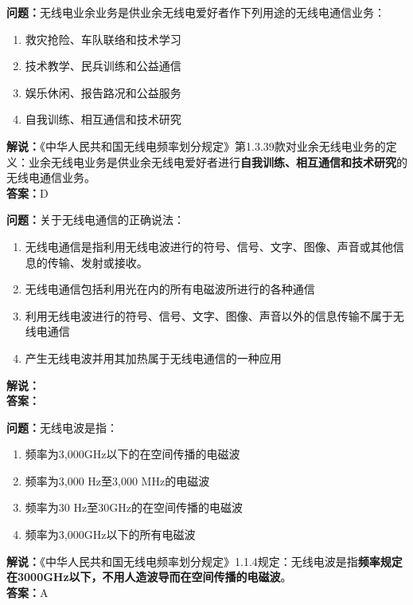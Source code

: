 \bigskip


\noindent\textbf{问题：}无线电业余业务是供业余无线电爱好者作下列用途的无线电通信业务：
\begin{enumerate}[label=\Alph*), leftmargin=3em]
\item 救灾抢险、车队联络和技术学习
\item 技术教学、民兵训练和公益通信
\item 娱乐休闲、报告路况和公益服务
\item 自我训练、相互通信和技术研究
\end{enumerate}
\noindent\textbf{解说：}《中华人民共和国无线电频率划分规定》第1.3.39款对业余无线电业务的定义：业余无线电业务是供业余无线电爱好者进行\textbf{自我训练、相互通信和技术研究}的无线电通信业务。\\\noindent\textbf{答案：}D

\bigskip


\noindent\textbf{问题：}关于无线电通信的正确说法：
\begin{enumerate}[label=\Alph*), leftmargin=3em]
\item 无线电通信是指利用无线电波进行的符号、信号、文字、图像、声音或其他信息的传输、发射或接收。
\item 无线电通信包括利用光在内的所有电磁波所进行的各种通信
\item 利用无线电波进行的符号、信号、文字、图像、声音以外的信息传输不属于无线电通信
\item 产生无线电波并用其加热属于无线电通信的一种应用
\end{enumerate}
\noindent\textbf{解说：}\\\noindent\textbf{答案：}

\bigskip


\noindent\textbf{问题：}无线电波是指：
\begin{enumerate}[label=\Alph*), leftmargin=3em]
\item 频率为3,000GHz以下的在空间传播的电磁波
\item 频率为3,000 Hz至3,000 MHz的电磁波
\item 频率为30 Hz至30GHz的在空间传播的电磁波
\item 频率为3,000GHz以下的所有电磁波
\end{enumerate}
\noindent\textbf{解说：}《中华人民共和国无线电频率划分规定》1.1.4规定：无线电波是指\textbf{频率规定在3000GHz以下，不用人造波导而在空间传播的电磁波}。\\\noindent\textbf{答案：}A



\bigskip



